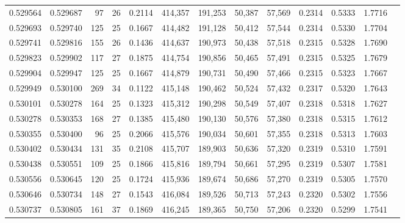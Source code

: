 \begin{tabular}{rrrrrrrrrrrrr}
0.529564 & 0.529687 &  97 &  26 &                                     0.2114 & 414,357 & 191,253 &  50,387 &  57,569 & 0.2314 & 0.5333 & 1.7716 \\
0.529693 & 0.529740 & 125 &  25 &                                     0.1667 & 414,482 & 191,128 &  50,412 &  57,544 & 0.2314 & 0.5330 & 1.7704 \\
0.529741 & 0.529816 & 155 &  26 &                                     0.1436 & 414,637 & 190,973 &  50,438 &  57,518 & 0.2315 & 0.5328 & 1.7690 \\
0.529823 & 0.529902 & 117 &  27 &                                     0.1875 & 414,754 & 190,856 &  50,465 &  57,491 & 0.2315 & 0.5325 & 1.7679 \\
0.529904 & 0.529947 & 125 &  25 &                                     0.1667 & 414,879 & 190,731 &  50,490 &  57,466 & 0.2315 & 0.5323 & 1.7667 \\
0.529949 & 0.530100 & 269 &  34 &                                     0.1122 & 415,148 & 190,462 &  50,524 &  57,432 & 0.2317 & 0.5320 & 1.7643 \\
0.530101 & 0.530278 & 164 &  25 &                                     0.1323 & 415,312 & 190,298 &  50,549 &  57,407 & 0.2318 & 0.5318 & 1.7627 \\
0.530278 & 0.530353 & 168 &  27 &                                     0.1385 & 415,480 & 190,130 &  50,576 &  57,380 & 0.2318 & 0.5315 & 1.7612 \\
0.530355 & 0.530400 &  96 &  25 &                                     0.2066 & 415,576 & 190,034 &  50,601 &  57,355 & 0.2318 & 0.5313 & 1.7603 \\
0.530402 & 0.530434 & 131 &  35 &                                     0.2108 & 415,707 & 189,903 &  50,636 &  57,320 & 0.2319 & 0.5310 & 1.7591 \\
0.530438 & 0.530551 & 109 &  25 &                                     0.1866 & 415,816 & 189,794 &  50,661 &  57,295 & 0.2319 & 0.5307 & 1.7581 \\
0.530556 & 0.530645 & 120 &  25 &                                     0.1724 & 415,936 & 189,674 &  50,686 &  57,270 & 0.2319 & 0.5305 & 1.7570 \\
0.530646 & 0.530734 & 148 &  27 &                                     0.1543 & 416,084 & 189,526 &  50,713 &  57,243 & 0.2320 & 0.5302 & 1.7556 \\
0.530737 & 0.530805 & 161 &  37 &                                     0.1869 & 416,245 & 189,365 &  50,750 &  57,206 & 0.2320 & 0.5299 & 1.7541 \\

\end{tabular}
